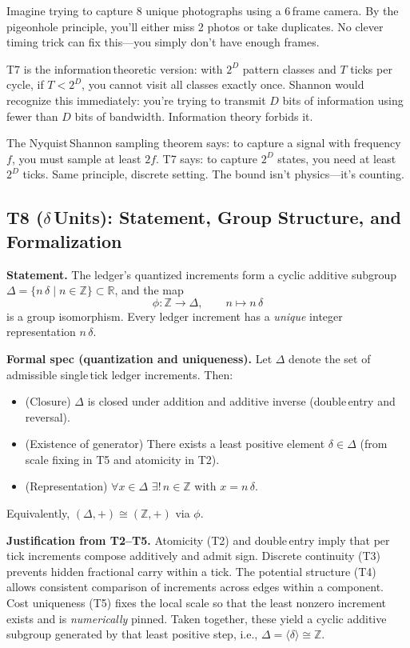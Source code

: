 \documentclass[11pt]{article}
\begin{document}
\begin{intuitionbox}
Imagine trying to capture 8 unique photographs using a 6\,frame camera. By the pigeonhole principle, you'll either miss 2 photos or take duplicates. No clever timing trick can fix this—you simply don't have enough frames.

T7 is the information\,theoretic version: with $2^D$ pattern classes and $T$ ticks per cycle, if $T<2^D$, you cannot visit all classes exactly once. Shannon would recognize this immediately: you're trying to transmit $D$ bits of information using fewer than $D$ bits of bandwidth. Information theory forbids it.

The Nyquist\,Shannon sampling theorem says: to capture a signal with frequency $f$, you must sample at least $2f$. T7 says: to capture $2^D$ states, you need at least $2^D$ ticks. Same principle, discrete setting. The bound isn't physics—it's counting.
\end{intuitionbox}

\subsection*{T8 ($\delta$\,Units): Statement, Group Structure, and Formalization}
\textbf{Statement.} The ledger’s quantized increments form a cyclic additive subgroup $\Delta=\{n\,\delta\mid n\in\mathbb Z\}\subset \mathbb R$, and the map
\begin{equation*}
  \phi : \mathbb Z \longrightarrow \Delta,\qquad n \longmapsto n\,\delta
\end{equation*}
is a group isomorphism. Every ledger increment has a \emph{unique} integer representation $n\,\delta$.

\medskip
\textbf{Formal spec (quantization and uniqueness).} Let $\Delta$ denote the set of admissible single\,tick ledger increments. Then:
\begin{itemize}[leftmargin=*]
  \item (Closure) $\Delta$ is closed under addition and additive inverse (double\,entry and reversal).
  \item (Existence of generator) There exists a least positive element $\delta\in\Delta$ (from scale fixing in T5 and atomicity in T2).
  \item (Representation) $\forall x\in\Delta\,\,\exists!\, n\in\mathbb Z$ with $x=n\,\delta$.
\end{itemize}
Equivalently, $(\Delta,+)\cong (\mathbb Z,+)$ via $\phi$.

\textbf{Justification from T2–T5.} Atomicity (T2) and double\,entry imply that per\,tick increments compose additively and admit sign. Discrete continuity (T3) prevents hidden fractional carry within a tick. The potential structure (T4) allows consistent comparison of increments across edges within a component. Cost uniqueness (T5) fixes the local scale so that the least nonzero increment exists and is \emph{numerically} pinned. Taken together, these yield a cyclic additive subgroup generated by that least positive step, i.e., $\Delta=\langle \delta\rangle\cong\mathbb Z$.
\end{document}
